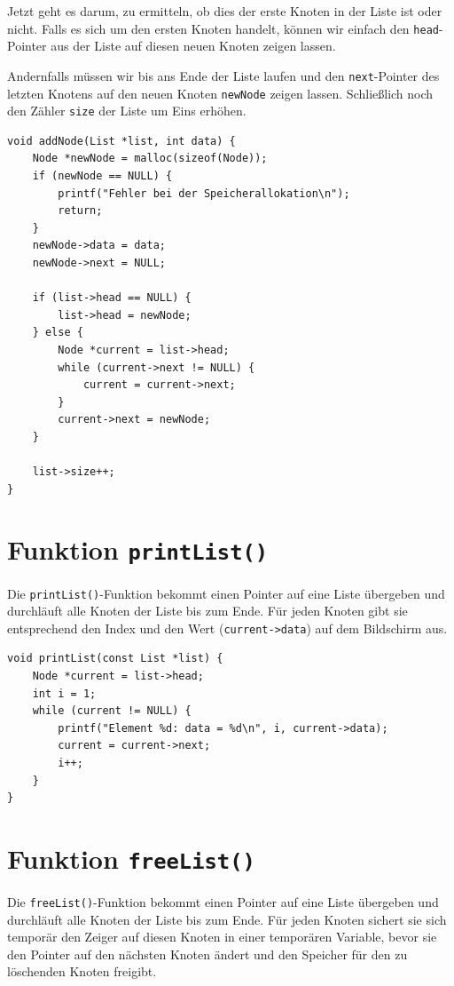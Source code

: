 Jetzt geht es darum, zu ermitteln, ob dies der erste Knoten in der Liste ist
oder nicht. Falls es sich um den ersten Knoten handelt, können wir einfach den
\texttt{head}-Pointer aus der Liste auf diesen neuen Knoten zeigen
lassen.

Andernfalls müssen wir bis ans Ende der Liste laufen und den
\texttt{next}-Pointer des letzten Knotens auf den neuen Knoten
\texttt{newNode} zeigen lassen. Schließlich noch den Zähler
\texttt{size} der Liste um Eins erhöhen.

\begin{verbatim}
void addNode(List *list, int data) {
    Node *newNode = malloc(sizeof(Node));
    if (newNode == NULL) {
        printf("Fehler bei der Speicherallokation\n");
        return;
    }
    newNode->data = data;
    newNode->next = NULL;

    if (list->head == NULL) {
        list->head = newNode;
    } else {
        Node *current = list->head;
        while (current->next != NULL) {
            current = current->next;
        }
        current->next = newNode;
    }

    list->size++;
}
\end{verbatim}

\section*{Funktion \texttt{printList()}}

Die \texttt{printList()}-Funktion bekommt einen Pointer auf eine Liste
übergeben und durchläuft alle Knoten der Liste bis zum Ende. Für jeden Knoten
gibt sie entsprechend den Index und den Wert (\texttt{current->data}) auf
dem Bildschirm aus.

\begin{verbatim}
void printList(const List *list) {
    Node *current = list->head;
    int i = 1;
    while (current != NULL) {
        printf("Element %d: data = %d\n", i, current->data);
        current = current->next;
        i++;
    }
}
\end{verbatim}

\section*{Funktion \texttt{freeList()}}

Die \texttt{freeList()}-Funktion bekommt einen Pointer auf eine Liste
übergeben und durchläuft alle Knoten der Liste bis zum Ende. Für jeden Knoten
sichert sie sich temporär den Zeiger auf diesen Knoten in einer temporären
Variable, bevor sie den Pointer auf den nächsten Knoten ändert und den Speicher
für den zu löschenden Knoten freigibt.

